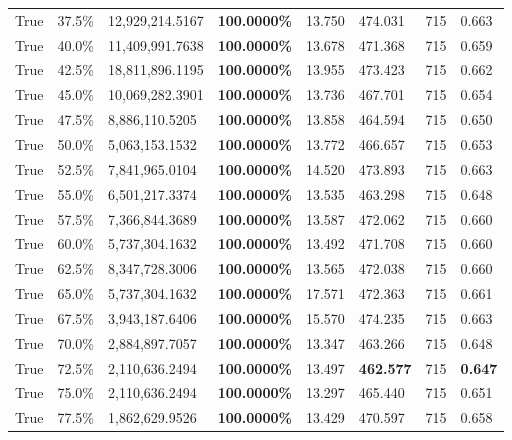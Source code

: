 \begin{table}[H]
\begin{tabular}{lllrllll}
\cline{1-8}
True & 37.5\% & 12,929,214.5167 & \bfseries \color{red} 100.0000\% & 13.750 & 474.031 & 715 & 0.663 \\
\cline{1-8}
True & 40.0\% & 11,409,991.7638 & \bfseries \color{red} 100.0000\% & 13.678 & 471.368 & 715 & 0.659 \\
\cline{1-8}
True & 42.5\% & 18,811,896.1195 & \bfseries \color{red} 100.0000\% & 13.955 & 473.423 & 715 & 0.662 \\
\cline{1-8}
True & 45.0\% & 10,069,282.3901 & \bfseries \color{red} 100.0000\% & 13.736 & 467.701 & 715 & 0.654 \\
\cline{1-8}
True & 47.5\% & 8,886,110.5205 & \bfseries \color{red} 100.0000\% & 13.858 & 464.594 & 715 & 0.650 \\
\cline{1-8}
True & 50.0\% & 5,063,153.1532 & \bfseries \color{red} 100.0000\% & 13.772 & 466.657 & 715 & 0.653 \\
\cline{1-8}
True & 52.5\% & 7,841,965.0104 & \bfseries \color{red} 100.0000\% & 14.520 & 473.893 & 715 & 0.663 \\
\cline{1-8}
True & 55.0\% & 6,501,217.3374 & \bfseries \color{red} 100.0000\% & 13.535 & 463.298 & 715 & 0.648 \\
\cline{1-8}
True & 57.5\% & 7,366,844.3689 & \bfseries \color{red} 100.0000\% & 13.587 & 472.062 & 715 & 0.660 \\
\cline{1-8}
True & 60.0\% & 5,737,304.1632 & \bfseries \color{red} 100.0000\% & 13.492 & 471.708 & 715 & 0.660 \\
\cline{1-8}
True & 62.5\% & 8,347,728.3006 & \bfseries \color{red} 100.0000\% & 13.565 & 472.038 & 715 & 0.660 \\
\cline{1-8}
True & 65.0\% & 5,737,304.1632 & \bfseries \color{red} 100.0000\% & 17.571 & 472.363 & 715 & 0.661 \\
\cline{1-8}
True & 67.5\% & 3,943,187.6406 & \bfseries \color{red} 100.0000\% & 15.570 & 474.235 & 715 & 0.663 \\
\cline{1-8}
True & 70.0\% & 2,884,897.7057 & \bfseries \color{red} 100.0000\% & 13.347 & 463.266 & 715 & 0.648 \\
\cline{1-8}
True & 72.5\% & 2,110,636.2494 & \bfseries \color{red} 100.0000\% & 13.497 & \bfseries \color{red} 462.577 & 715 & \bfseries \color{red} 0.647 \\
\cline{1-8}
True & 75.0\% & 2,110,636.2494 & \bfseries \color{red} 100.0000\% & 13.297 & 465.440 & 715 & 0.651 \\
\cline{1-8}
True & 77.5\% & 1,862,629.9526 & \bfseries \color{red} 100.0000\% & 13.429 & 470.597 & 715 & 0.658 \\

\end{tabular}
\end{table}
